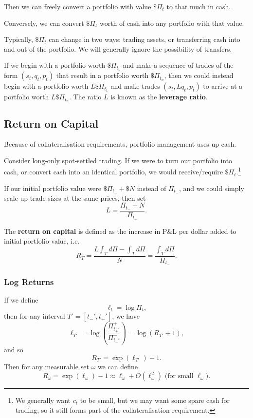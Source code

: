 \documentclass{article}
\begin{document}
Then we can freely convert a portfolio with value $\$\Pi_t$ to that much in cash.

Conversely, we can convert $\$\Pi_t$ worth of cash into any portfolio with that value.

Typically, $\$\Pi_t$ can change in two ways: trading assets, or transferring cash into and out of the portfolio. We will generally ignore the possibility of transfers.

If we begin with a portfolio worth $\$\Pi_{t_1}$ and make a sequence of trades of the form $(s_t,q_t,p_t)$ that result in a portfolio worth $\$\Pi_{t_n}$, then we could instead begin with a portfolio worth $L \$\Pi_{t_1}$ and make trades $(s_t, L q_t, p_t)$ to arrive at a portfolio worth $L \$\Pi_{t_n}$. The ratio $L$ is known as the \textbf{leverage ratio}.

\subsection{Return on Capital}
Because of collateralisation requirements, portfolio management uses up cash.

Consider long-only spot-settled trading. If we were to turn our portfolio into cash, or convert cash into an identical portfolio, we would receive/require $\$\Pi_t$.\footnote{We generally want $c_t$ to be small, but we may want some spare cash for trading, so it still forms part of the collateralisation requirement.}%


If our initial portfolio value were $\$\Pi_{t_-}+\$N$ instead of $\Pi_{t_-}$, and we could simply scale up trade sizes at the same prices, then set
$$L = \frac{\Pi_{t_-}+N}{\Pi_{t_-}}.$$

The \textbf{return on capital} is defined as the increase in P\&L per dollar added to initial portfolio value, i.e.
$$R_T = \frac{L \int_T d\Pi - \int_T d\Pi}{N} = \frac{\int_T d\Pi}{\Pi_{t_-}}.$$

\subsubsection{Log Returns}
If we define
$$\ell_t = \log \Pi_t,$$ %
then for any interval $T'=[t_-',t_+']$, we have
$$\ell_{T'} = \log\left(\frac{\Pi_{t_+'}^+}{\Pi_{t_-'}^-}\right)= \log(R_{T'}+1),$$
and so
$$R_{T'} = \exp(\ell_{T'}) - 1.$$
Then for any measurable set $\omega$ we can define
$$R_\omega = \exp(\ell_\omega) - 1 \approx \ell_\omega + O(\ell_\omega^2)\textrm{ (for small }\ell_\omega\textrm{)}.$$
\end{document}
